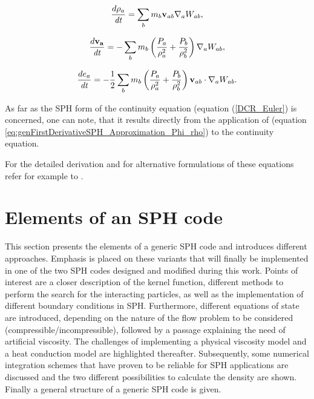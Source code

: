 \documentclass{report}
\begin{document}
\begin{equation}
\label{eq:DCR_Euler}
\frac{d\rho _a}{\mathit{dt}}=\sum_b{m_{b}{\bf v_{\mathit{ab}}}\nabla _{a}W_{\mathit{ab}}},
\end{equation}

\begin{equation}
\label{eq:VCR_Euler}
\frac{ d {\bf v_{a}}}{\mathit{dt}}=-\sum_b {m_{b}\left(\frac{P_{a}}{\rho_{a}^{2}}+\frac{P_{b}}{\rho _{b}^{2}}\right)\nabla_{a}W_{ab}},
\end{equation}


\begin{equation}
\label{eq:ECR_Euler}
\frac{de_{a}}{\mathit{dt}}=-\mathit{}\frac{1}{2}\sum_b{m_{b}\left(\frac{P_{a}}{\rho _{a}^{2}}+\frac{P_{b}}{\rho _{b}^{2}}\right){\bf v_{\mathit{ab}}}\cdot\nabla _{a}W_{\mathit{ab}}}.
\end{equation}

As far as the SPH form of the continuity equation (equation (\ref{DCR_Euler}) is concerned, one can note, that it results directly from the application of (equation \ref{eq:genFirstDerivativeSPH_Approximation_Phi_rho}) to the continuity equation.

For the detailed derivation and for alternative formulations of
these equations refer for example to \cite{Monaghan2005, Liu2003}.



\section{Elements of an SPH code}
\label{sec:ElementsOfSPH}
This section presents the elements of a generic SPH code and introduces different approaches. Emphasis is
placed on these variants that will finally be implemented in one of the
two SPH codes designed and modified during this work.
Points of interest are a closer description of the kernel function, different methods to perform the search for the interacting particles, as well as the implementation of different boundary conditions in
SPH. Furthermore, different
equations of state are introduced, depending on the nature of the flow problem
to be considered (compressible/incompressible), followed by a passage
explaining the need of artificial viscosity. The challenges of implementing a physical viscosity model and a heat conduction model are highlighted thereafter. Subsequently, some numerical
integration schemes that have proven to be reliable for SPH applications are discussed and the two different possibilities to calculate the density are shown. Finally a general structure of a generic SPH code is given.
\end{document}
